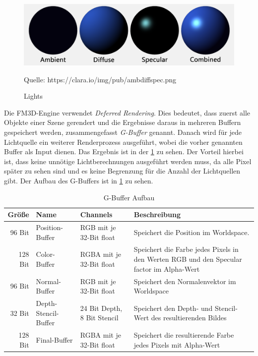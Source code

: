 \begin{figure}
	\centering
	\includegraphics[scale=0.4]{02theorie/amb_diff_spec.png}
		
	Quelle: https://clara.io/img/pub/amb\textunderscore diff\textunderscore spec.png
	\caption{Lights}\label{Img:Lights}
\end{figure}

Die FM3D-Engine verwendet \textit{Deferred Rendering}. Dies bedeutet, dass zuerst alle Objekte einer Szene gerendert und die Ergebnisse daraus in mehreren Buffern gespeichert werden, zusammengefasst \textit{G-Buffer} genannt. Danach wird für jede Lichtquelle ein weiterer Renderprozess ausgeführt, wobei die vorher genannten Buffer als Input dienen. Das Ergebnis ist in der \cref{Img:Lights} zu sehen. Der Vorteil hierbei ist, dass keine unnötige Lichtberechnungen ausgeführt werden muss, da alle Pixel später zu sehen sind und es keine Begrenzung für die Anzahl der Lichtquellen gibt. Der Aufbau des G-Buffers ist in \cref{table:GBuffer} zu sehen.

\begin{table}
	\caption{G-Buffer Aufbau}
	\label{table:GBuffer}
	\centering
	\begin{tabular}{rlll}\toprule[1.5pt]
		Größe & Name & Channels & Beschreibung \\\midrule
		96 Bit  & Position-Buffer & RGB mit je 32-Bit float & Speichert die Position im Worldspace.\\
		128 Bit & Color-Buffer & RGBA mit je 32-Bit float & Speichert die Farbe jedes Pixels in den Werten RGB und den Specular factor im Alpha-Wert \\
		96 Bit & Normal-Buffer & RGB mit je 32-Bit float & Speichert den Normalenvektor im Worldspace \\
		32 Bit & Depth-Stencil-Buffer & 24 Bit Depth, 8 Bit Stencil & Speichert den Depth- und Stencil-Wert des resultierenden Bildes \\
		128 Bit & Final-Buffer & RGBA mit je 32-Bit float & Speichert die resultierende Farbe jedes Pixels mit Alpha-Wert \\\bottomrule[1.5pt]
	\end{tabular}
\end{table}
